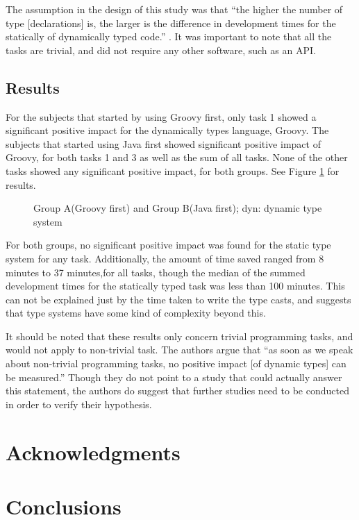 \documentclass{sig-alternate}
\begin{document}
The assumption in the design of this study was that ``the higher the number of type [declarations] is, the larger is the difference in development times for the statically of dynamically typed code.'' \cite{Stuchlik2011}. It was important to note that all the tasks are trivial, and did not require any other software, such as an API. 
 
\subsection{Results}
For the subjects that started by using Groovy first, only task 1 showed a significant positive impact for the dynamically types language, Groovy. The subjects that started using Java first showed significant positive impact of Groovy, for both tasks 1 and 3 as well as the sum of all tasks. None of the other tasks showed any significant positive impact, for both groups. See Figure \ref{Relationresults} for results.

\begin{figure}
\centering
{}
\caption{Group A(Groovy first) and Group B(Java first); dyn: dynamic type system \cite{Stuchlik2011}}
\label{Relationresults}
\end{figure}

For both groups, no significant positive impact was found for the static type system for any task. Additionally, the amount of time saved ranged from 8 minutes to 37 minutes,for all tasks, though the median of the summed development times for the statically typed task was less than 100 minutes. This can not be explained just by the time taken to write the type casts, and suggests that type systems have some kind of complexity beyond this.

It should be noted that these results only concern trivial programming tasks, and would not apply to non-trivial task. The authors argue that ``as soon as we speak about non-trivial programming tasks, no positive impact [of dynamic types] can be measured.'' Though they do not point to a study that could actually answer this statement, the authors do suggest that further studies need to be conducted in order to verify their hypothesis.
\section{Acknowledgments}

\section{Conclusions}\label{results}




\end{document}
